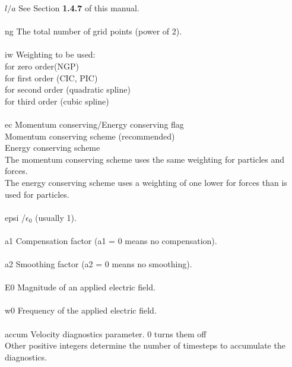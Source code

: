 \begin{section}
\begin{subsection}
\begin{subsubsection}
\begin{tabbing}
      $l/a$     \>      See Section {\bf 1.4.7} of this manual. \> \\
								\\
      ng     \>        The total number of grid points (power of 2). \> \\
									\\
      iw     \>       Weighting to be used: \> \\
               for zero order(NGP) \> \\
  	       for first order (CIC, PIC) \> \\
                for second order (quadratic spline)  \> \\
                for third order (cubic spline) \> \\
								\\
      ec     \>	     Momentum conserving/Energy conserving flag  \> \\
	       Momentum conserving scheme (recommended)  \> \\
	       Energy conserving scheme             \> \\
	     \>      The momentum conserving scheme uses the same weighting for particles and forces.  \> \\
	     \>      The energy conserving scheme uses a weighting of one lower for forces than is used for particles.  \> \\
								\\
      epsi     /$\epsilon_{0}$ (usually 1). \> \\
								\\
      a1      \>      Compensation factor (a1 = 0 means no
compensation). \> \\
							\\ 
      a2       \>     Smoothing factor (a2 = 0 means no smoothing). \> \\
										\\
      E0      \>       Magnitude of an applied electric field. \\
								\\
      w0     \>       Frequency of the applied electric field.\> \\
								 \\
      accum   \>      Velocity diagnostics parameter.  0 turns them off  \> \\
	      \>      Other positive integers determine the number of timesteps to accumulate the diagnostics.  \> \\
\end{tabbing}


\end{subsubsection}
\end{subsection}
\end{section}
